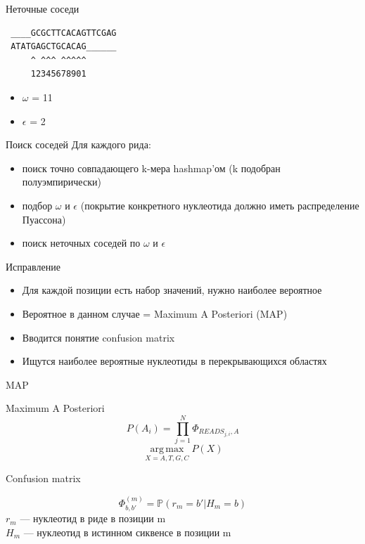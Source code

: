 \documentclass[10pt]{beamer}
\begin{document}
\begin{frame}[fragile]{Неточные соседи}
\begin{verbatim}
 ____GCGCTTCACAGTTCGAG
 ATATGAGCTGCACAG______
     ^ ^^^ ^^^^^
     12345678901
\end{verbatim}
  \begin{itemize}
    \item $\omega$ = 11
    \item $\epsilon$ = 2
  \end{itemize}
\end{frame}

\begin{frame}{Поиск соседей}
  Для каждого рида:
  \begin{itemize}
  \item поиск точно совпадающего k-мера hashmap'ом (k подобран полуэмпирически)
  \item подбор $\omega$ и $\epsilon$ (покрытие конкретного нуклеотида должно иметь распределение Пуассона)
  \item поиск неточных соседей по $\omega$ и $\epsilon$
  \end{itemize}
\end{frame}

\begin{frame}{Исправление}
  \begin{itemize}
  \item Для каждой позиции есть набор значений, нужно наиболее
    вероятное
  \item Вероятное в данном случае = Maximum A Posteriori (MAP)
  \item Вводится понятие confusion matrix
  \item Ищутся наиболее вероятные нуклеотиды в перекрывающихся областях
  \end{itemize}
\end{frame}

\begin{frame}{MAP}
  \begin{center}
    \Large
    Maximum A Posteriori
    \[P(A_i) = \prod_{j=1}^{N} \Phi_{READS_{j,i}, A}\]
    \[\operatorname*{arg\,max}_{X=A,T,G,C} P(X)\]
  \end{center}
\end{frame}

\begin{frame}{Confusion matrix}
  \begin{center}
    \Large
    \begin{equation*}
      \Phi^{(m)}_{b,b'} = \mathds{P}(r_m = b' | H_m = b)
    \end{equation*}
    \large
    $r_m$ — нуклеотид в риде в позиции m\\
    $H_m$ — нуклеотид в истинном сиквенсе в позиции m
  \end{center}
\end{frame}
\end{document}
